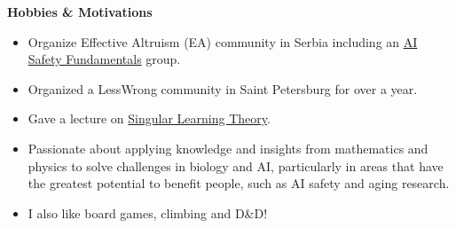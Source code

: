 \documentclass[12pt]{article}   %
\begin{document}
\vspace{1em}

\noindent \textbf{\Large Hobbies \& Motivations}
\begin{itemize}
    \item Organize Effective Altruism (EA) community in Serbia including an  
          \href{https://course.aisafetyfundamentals.com/alignment?_gl=1*1xg9r59*_ga*MTgyMzIzOTUwNS4xNjk4MzQwMDQy*_ga_LGQ75B1P00*MTcwNjcxMTA1OC4zLjEuMTcwNjcxMTA5MC4wLjAuMA..}{AI Safety Fundamentals} group.
    \item Organized a LessWrong community in Saint Petersburg for over a year. \href{https://t.me/lwspbmeetup}{\faTelegram}
    \item Gave a lecture on \href{https://arxiv.org/abs/2010.11560}{Singular Learning Theory}. \href{https://docs.google.com/presentation/d/1JL1xWLcikkNfF525fB3_898bV1WCuJnnCUft8oKcJ-M/edit?usp=sharing}{\faChalkboardTeacher}
    \item Passionate about applying knowledge and insights from mathematics and physics to solve challenges in biology and AI, particularly in areas that have the greatest potential to benefit people, such as AI safety and aging research.
    \item I also like board games, climbing and D\&D!
\end{itemize}
\end{document}
